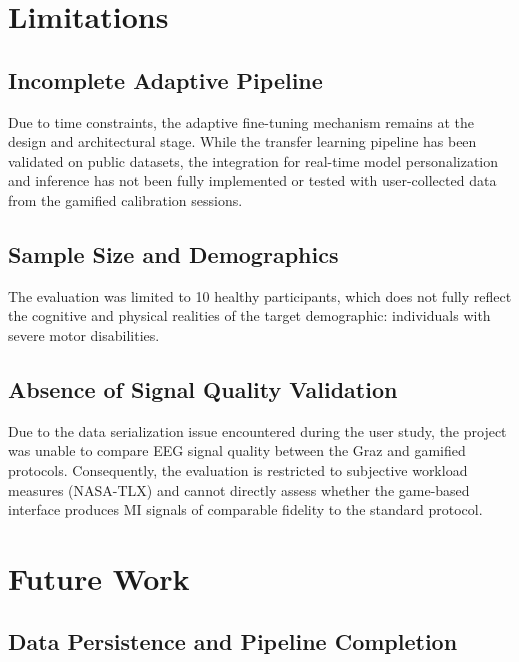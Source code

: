 \documentclass[a4paper, 11pt, openany]{report}
\begin{document}
    \section{Limitations}

    \subsection{Incomplete Adaptive Pipeline}
    
    Due to time constraints, the adaptive fine-tuning mechanism remains at 
    the design and architectural stage. While the transfer learning pipeline has been validated on public datasets, 
    the integration for real-time model personalization and inference has not been fully implemented or tested with 
    user-collected data from the gamified calibration sessions.

    \subsection{Sample Size and Demographics}
    
    The evaluation was limited to 10 healthy participants, which does not fully 
    reflect the cognitive and physical realities of the target demographic: individuals with severe motor disabilities.

    \subsection{Absence of Signal Quality Validation}
    
    Due to the data serialization issue encountered during the user study, 
    the project was unable to compare EEG signal quality between the Graz and gamified protocols. Consequently, the 
    evaluation is restricted to subjective workload measures (NASA-TLX) and cannot directly assess whether the game-based 
    interface produces MI signals of comparable fidelity to the standard protocol.


    \section{Future Work}

    \subsection{Data Persistence and Pipeline Completion}
    
\end{document}
